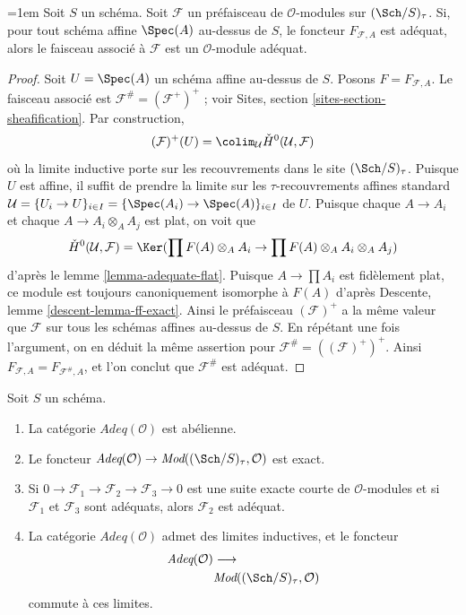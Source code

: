 \begin{lemma}
\label{lemma-sheafification-adequate}
{\emergencystretch=1em
Soit $S$ un schéma. Soit $\mathcal{F}$ un préfaisceau de $\mathcal{O}$-modules
sur $(\Sch/S)_\tau$. Si, pour tout schéma affine
$\Spec(A)$ au-dessus de $S$, le foncteur $F_{\mathcal{F}, A}$ est
adéquat, alors le faisceau associé à $\mathcal{F}$ est un
$\mathcal{O}$-module adéquat.\par}
\end{lemma}

\begin{proof}
Soit $U = \Spec(A)$ un schéma affine au-dessus de $S$.
Posons $F = F_{\mathcal{F}, A}$.
Le faisceau associé est $\mathcal{F}^\# = (\mathcal{F}^+)^+$ ; voir
Sites, section \ref{sites-section-sheafification}.
Par construction,
$$
(\mathcal{F})^+(U) =
\colim_\mathcal{U} \check{H}^0(\mathcal{U}, \mathcal{F})
$$
où la limite inductive porte sur les recouvrements dans le site $(\Sch/S)_\tau$.
Puisque $U$ est affine, il suffit de prendre la limite sur les
$\tau$-recouvrements affines standard
$\mathcal{U} = \{U_i \to U\}_{i \in I} =
\{\Spec(A_i) \to \Spec(A)\}_{i \in I}$ de $U$.
Puisque chaque $A \to A_i$ et chaque $A \to A_i \otimes_A A_j$ est plat, on voit que
$$
\check{H}^0(\mathcal{U}, \mathcal{F}) =
\Ker(\prod F(A) \otimes_A A_i \to \prod F(A) \otimes_A A_i \otimes_A A_j)
$$
d'après le
lemme \ref{lemma-adequate-flat}.
Puisque $A \to \prod A_i$ est fidèlement plat, ce module
est toujours canoniquement isomorphe à $F(A)$ d'après
Descente, lemme \ref{descent-lemma-ff-exact}.
Ainsi le préfaisceau $(\mathcal{F})^+$ a la même valeur que
$\mathcal{F}$ sur tous les schémas affines au-dessus de $S$. En répétant une fois
l'argument, on en déduit la même assertion pour $\mathcal{F}^\# = ((\mathcal{F})^+)^+$.
Ainsi $F_{\mathcal{F}, A} = F_{\mathcal{F}^\#, A}$, et l'on conclut
que $\mathcal{F}^\#$ est adéquat.
\end{proof}

\begin{lemma}
\label{lemma-abelian-adequate}
Soit $S$ un schéma.
\begin{enumerate}
\item La catégorie $\textit{Adeq}(\mathcal{O})$ est abélienne.
\item Le foncteur
$\textit{Adeq}(\mathcal{O}) \to
\textit{Mod}((\Sch/S)_\tau, \mathcal{O})$
est exact.
\item Si $0 \to \mathcal{F}_1 \to \mathcal{F}_2 \to \mathcal{F}_3 \to 0$
est une suite exacte courte de $\mathcal{O}$-modules et si
$\mathcal{F}_1$ et $\mathcal{F}_3$ sont adéquats, alors
$\mathcal{F}_2$ est adéquat.
\item La catégorie $\textit{Adeq}(\mathcal{O})$ admet des limites inductives, et
le foncteur
$$
\begin{aligned}
\textit{Adeq}(\mathcal{O}) & \longrightarrow \\
& \textit{Mod}((\Sch/S)_\tau, \mathcal{O})
\end{aligned}
$$
commute à ces limites.
\end{enumerate}
\end{lemma}

